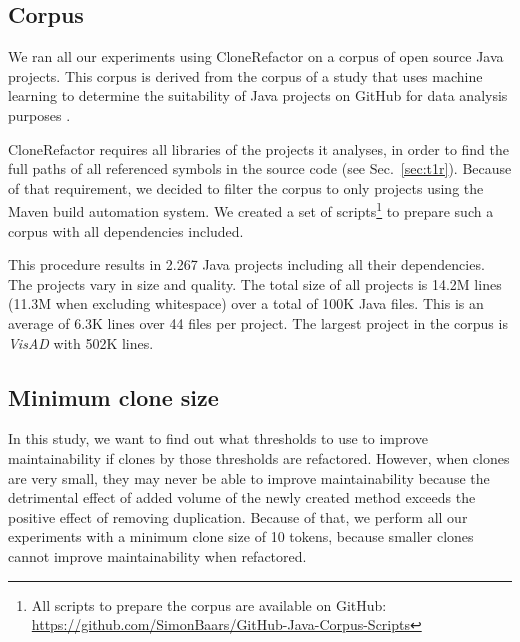 \documentclass[sigconf,review, table]{acmart}
\begin{document}
\subsection{Corpus}
We ran all our experiments using CloneRefactor on a corpus of open source Java projects. This corpus is derived from the corpus of a study that uses machine learning to determine the suitability of Java projects on GitHub for data analysis purposes \cite{githubCorpus2013}.

CloneRefactor requires all libraries of the projects it analyses, in order to find the full paths of all referenced symbols in the source code (see Sec.~\ref{sec:t1r}). Because of that requirement, we decided to filter the corpus to only projects using the Maven build automation system. We created a set of scripts\footnote{All scripts to prepare the corpus are available on GitHub: \url{https://github.com/SimonBaars/GitHub-Java-Corpus-Scripts}} to prepare such a corpus with all dependencies included.

This procedure results in 2.267 Java projects including all their dependencies. The projects vary in size and quality. The total size of all projects is 14.2M lines (11.3M when excluding whitespace) over a total of 100K Java files. This is an average of 6.3K lines over 44 files per project. The largest project in the corpus is \textit{VisAD} with 502K lines.

\subsection{Minimum clone size}
In this study, we want to find out what thresholds to use to improve maintainability if clones by those thresholds are refactored. However, when clones are very small, they may never be able to improve maintainability because the detrimental effect of added volume of the newly created method exceeds the positive effect of removing duplication. Because of that, we perform all our experiments with a minimum clone size of 10 tokens, because smaller clones cannot improve maintainability when refactored.
\end{document}
